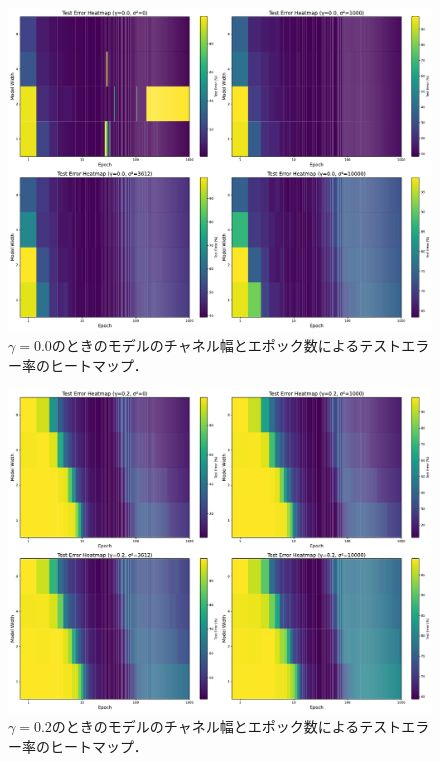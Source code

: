 \begin{figure}[H]
    \centering
    \includegraphics[width=\linewidth]{fig/heatmap_ln/ln0.pdf}
    \caption{$\gamma=0.0$のときのモデルのチャネル幅とエポック数によるテストエラー率のヒートマップ．
    }
    \label{fig:modelwidth_heatmap_0}
\end{figure}

\begin{figure}[H]
    \centering
    \includegraphics[width=\linewidth]{fig/heatmap_ln/ln0.2.pdf}
    \caption{$\gamma=0.2$のときのモデルのチャネル幅とエポック数によるテストエラー率のヒートマップ．}
    \label{fig:modelwidth_heatmap_0.2}
\end{figure}

